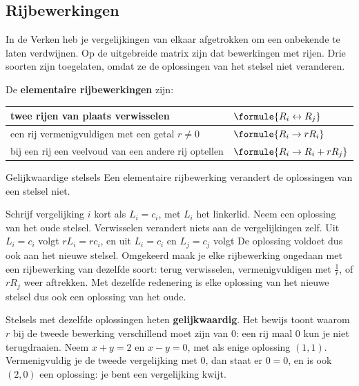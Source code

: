 \subsection{Rijbewerkingen}

In de Verken heb je vergelijkingen van elkaar afgetrokken om een onbekende te laten verdwijnen. Op de uitgebreide matrix zijn dat bewerkingen met rijen. Drie soorten zijn toegelaten, omdat ze de oplossingen van het stelsel niet veranderen.

\begin{theorie}
De \textbf{\textcolor{accent}{elementaire rijbewerkingen}} zijn:

\vspace{1mm}
{\centering{}\renewcommand{\arraystretch}{1.5}%
\begin{tabular}{|>{\centering\arraybackslash}m{6.6cm}|>{\centering\arraybackslash}m{3.6cm}|}
\hline
twee rijen van plaats verwisselen & $\formule{R_i \leftrightarrow R_j}$ \\ \hline
een rij vermenigvuldigen met een getal $r \neq 0$ & $\formule{R_i \to rR_i}$ \\ \hline
bij een rij een veelvoud van een andere rij optellen & $\formule{R_i \to R_i + rR_j}$ \\ \hline
\end{tabular}\par}

\begin{stelling}{Gelijkwaardige stelsels}
Een elementaire rijbewerking verandert de oplossingen van een stelsel niet.
\end{stelling}

\begin{bewijs}
Schrijf vergelijking $i$ kort als $L_i = c_i$, met $L_i$ het linkerlid. Neem een oplossing van het oude stelsel. Verwisselen verandert niets aan de vergelijkingen zelf. Uit $L_i = c_i$ volgt $rL_i = rc_i$, en uit $L_i = c_i$ en $L_j = c_j$ volgt
De oplossing voldoet dus ook aan het nieuwe stelsel. Omgekeerd maak je elke rijbewerking ongedaan met een rijbewerking van dezelfde soort: terug verwisselen, vermenigvuldigen met $\frac1r$, of $rR_j$ weer aftrekken. Met dezelfde redenering is elke oplossing van het nieuwe stelsel dus ook een oplossing van het oude.
\end{bewijs}
\end{theorie}

Stelsels met dezelfde oplossingen heten \textbf{gelijkwaardig}. Het bewijs toont waarom $r$ bij de tweede bewerking verschillend moet zijn van 0: een rij maal 0 kun je niet terugdraaien. Neem $x + y = 2$ en $x - y = 0$, met als enige oplossing $(1, 1)$. Vermenigvuldig je de tweede vergelijking met 0, dan staat er $0 = 0$, en is ook $(2, 0)$ een oplossing: je bent een vergelijking kwijt.

